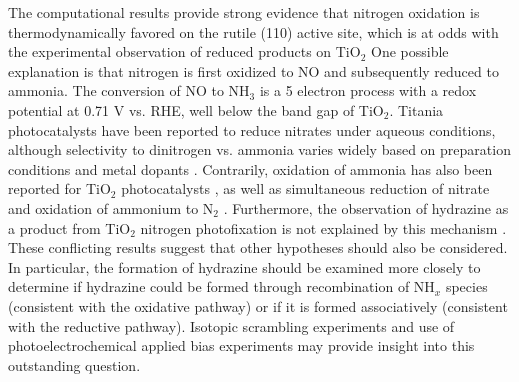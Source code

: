 \documentclass[journal=ascecg,manuscript=article,articletitle=true]{achemso}
\begin{document}
The computational results provide strong evidence that nitrogen oxidation is thermodynamically favored on the rutile (110) active site, which is at odds with the experimental observation of reduced products on TiO$_2$\cite{Schrauzer_1977,Schrauzer_1983,Augugliaro_1982,Soria_1991,Schrauzer_2011,Hirakawa_2017} One possible explanation is that nitrogen is first oxidized to NO and subsequently reduced to ammonia. The conversion of NO to NH$_3$ is a 5 electron process with a redox potential at 0.71 V vs. RHE, well below the band gap of TiO$_2$\cite{Medford_2017}. 
Titania photocatalysts have been reported to reduce nitrates under aqueous conditions, although selectivity to dinitrogen vs. ammonia varies widely based on preparation conditions and metal dopants \cite{Kobwittaya_2014, Kominami_2010, Ranjit_1997,Shand_2013,Xie_2017,Lozovskii_2009}. Contrarily, oxidation of ammonia has also been reported for TiO$_2$ photocatalysts \cite{Pollema_1992, Wang_1994, Kominami_2014}, as well as simultaneous reduction of nitrate and oxidation of ammonium to N$_2$ \cite{Kominami_2014}. Furthermore, the observation of hydrazine as a product from TiO$_2$ nitrogen photofixation is not explained by this mechanism \cite{Schrauzer_2011}. These conflicting results suggest that other hypotheses should also be considered. In particular, the formation of hydrazine should be examined more closely to determine if hydrazine could be formed through recombination of NH$_x$ species (consistent with the oxidative pathway) or if it is formed associatively (consistent with the reductive pathway). Isotopic scrambling experiments\cite{Urabe_1978} and use of photoelectrochemical applied bias experiments may provide insight into this outstanding question.
\end{document}
